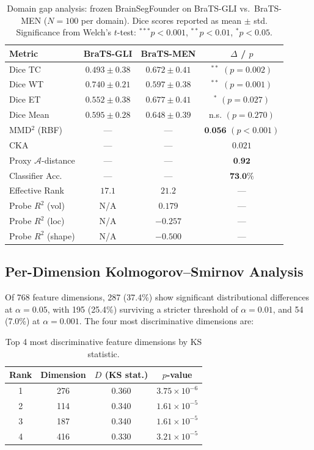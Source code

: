 \documentclass[11pt,a4paper]{article}
\theoremstyle{definition}
\begin{document}
\begin{table}[t]
  \centering
  \caption{Domain gap analysis: frozen BrainSegFounder on BraTS-GLI vs.\ BraTS-MEN ($N = 100$ per domain). Dice scores reported as mean $\pm$ std. Significance from Welch's $t$-test: $^{***}p < 0.001$, $^{**}p < 0.01$, $^{*}p < 0.05$.}
  \label{tab:domain-gap-results}
  \begin{tabular}{lccc}
    \toprule
    Metric & BraTS-GLI & BraTS-MEN & $\Delta$ / $p$ \\
    \midrule
    Dice TC & $0.493 \pm 0.38$ & $0.672 \pm 0.41$ & $^{**}$ $(p = 0.002)$ \\
    Dice WT & $0.740 \pm 0.21$ & $0.597 \pm 0.38$ & $^{**}$ $(p = 0.001)$ \\
    Dice ET & $0.552 \pm 0.38$ & $0.677 \pm 0.41$ & $^{*}$ $(p = 0.027)$ \\
    Dice Mean & $0.595 \pm 0.28$ & $0.648 \pm 0.39$ & n.s. $(p = 0.270)$ \\
    \midrule
    MMD$^2$ (RBF) & --- & --- & $\textbf{0.056}$ $(p < 0.001)$ \\
    CKA & --- & --- & $0.021$ \\
    Proxy $\mathcal{A}$-distance & --- & --- & $\textbf{0.92}$ \\
    Classifier Acc. & --- & --- & $\textbf{73.0\%}$ \\
    Effective Rank & $17.1$ & $21.2$ & --- \\
    \midrule
    Probe $R^2$ (vol) & N/A & $0.179$ & --- \\
    Probe $R^2$ (loc) & N/A & $-0.257$ & --- \\
    Probe $R^2$ (shape) & N/A & $-0.500$ & --- \\
    \bottomrule
  \end{tabular}
\end{table}

\subsection{Per-Dimension Kolmogorov--Smirnov Analysis}

Of 768 feature dimensions, 287 (37.4\%) show significant distributional differences at $\alpha = 0.05$, with 195 (25.4\%) surviving a stricter threshold of $\alpha = 0.01$, and 54 (7.0\%) at $\alpha = 0.001$. The four most discriminative dimensions are:

\begin{table}[h]
  \centering
  \caption{Top 4 most discriminative feature dimensions by KS statistic.}
  \label{tab:ks-top4}
  \begin{tabular}{cccc}
    \toprule
    Rank & Dimension & $D$ (KS stat.) & $p$-value \\
    \midrule
    1 & 276 & 0.360 & $3.75 \times 10^{-6}$ \\
    2 & 114 & 0.340 & $1.61 \times 10^{-5}$ \\
    3 & 187 & 0.340 & $1.61 \times 10^{-5}$ \\
    4 & 416 & 0.330 & $3.21 \times 10^{-5}$ \\
    \bottomrule
  \end{tabular}
\end{table}
\end{document}
